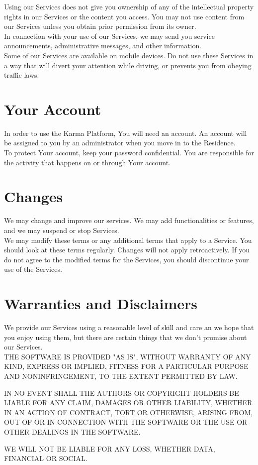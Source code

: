 \documentclass[12pt,a4paper]{article}
\begin{document}
Using our Services does not give you ownership of any of the intellectual property rights in our Services or the content you access. You may not use content from our Services unless you obtain prior permission from its owner. \\

In connection with your use of our Services, we may send you service announcements, administrative messages, and other information. \\

Some of our Services are available on mobile devices. Do not use these Services in a way that will divert your attention while driving, or prevents you from obeying traffic laws.

\section{Your Account}

In order to use the Karma Platform, You will need an account. An account will be assigned to you by an administrator when you move in to the Residence. \\

To protect Your account, keep your password confidential. You are responsible for the activity that happens on or through Your account.

\section{Changes}

We may change and improve our services. We may add functionalities or features, and we may suspend or stop Services. \\

We may modify these terms or any additional terms that apply to a Service. You should look at these terms regularly. Changes will not apply retroactively. If you do not agree to the modified terms for the Services, you should discontinue your use of the Services.


\section{Warranties and Disclaimers}

We provide our Services using a reasonable level of skill and care an we hope that you enjoy using them, but there are certain things that we don't promise about our Services. \\

THE SOFTWARE IS PROVIDED "AS IS", WITHOUT WARRANTY OF ANY KIND, EXPRESS OR IMPLIED, FITNESS FOR A PARTICULAR PURPOSE AND NONINFRINGEMENT, TO THE EXTENT PERMITTED BY LAW.

IN NO EVENT SHALL THE AUTHORS OR COPYRIGHT HOLDERS BE LIABLE FOR ANY CLAIM,  DAMAGES OR OTHER LIABILITY, WHETHER IN AN ACTION OF CONTRACT, TORT OR OTHERWISE, ARISING FROM, OUT OF OR IN CONNECTION WITH THE SOFTWARE OR THE USE OR OTHER DEALINGS IN THE SOFTWARE.

WE WILL NOT BE LIABLE FOR ANY LOSS, WHETHER DATA, FINANCIAL OR SOCIAL.
\end{document}
